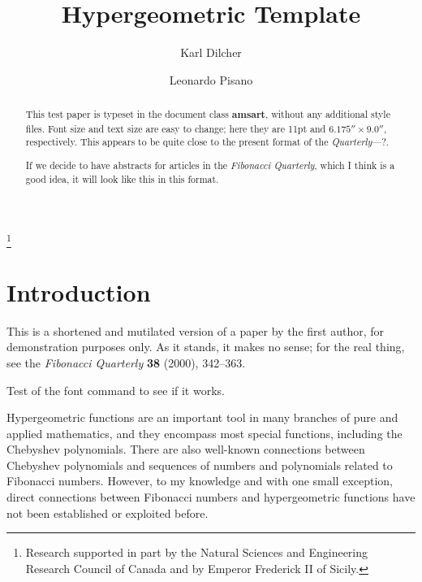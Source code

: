 \documentclass[11pt,reqno]{amsart}
\makeatletter
\newcommand{\monthyear}[1]{%
  \def\@monthyear{\uppercase{#1}}}
\newcommand{\volnumber}[1]{%
  \def\@volnumber{\uppercase{#1}}}
\theoremstyle{plain}
\numberwithin{equation}{section}
\newcommand{\helv}{%
  \fontfamily{phv}\fontseries{m}\fontsize{9}{11}\selectfont}
\makeatother
\begin{document}
\monthyear{Month Year}
\volnumber{Volume, Number}
\setcounter{page}{1}

\title{Hypergeometric Template}
\author{Karl Dilcher}
\address{Department of Mathematics and Statistics\\
                Dalhousie University\\
                Halifax, Nova Scotia\\
                B3H 3J5, Canada}
\thanks{Research supported in part by the Natural Sciences and Engineering Research Council of Canada and by Emperor Frederick II of Sicily.}
\author{Leonardo Pisano}
\address{Dipartimento di Matematica\\
               Universit\`{a} di Pisa\\
               144 Via Fibonacci\\
               56127 Pisa, Italy}

\begin{abstract}
This test paper is typeset in the document class \textbf{amsart},
without any additional style files.  Font size and text size are
easy to change; here they are 11pt and $6.175'' \times 9.0''$,
respectively.  This appears to be quite close to the present format
of the \textit{Quarterly}---?.

If we decide to have abstracts for articles in the \textit{Fibonacci
Quarterly}, which I think is a good idea, it will look like this in
this format.
\end{abstract}

\maketitle

\section{Introduction}
This is a shortened and mutilated version of a paper by the first
author, for demonstration purposes only.  As it stands, it makes no
sense; for the real thing, see the \textit{Fibonacci Quarterly}
\textbf{38} (2000), 342--363.

Test of the {\helv font command} to see if it works.

Hypergeometric functions are an important tool in many branches of
pure and applied mathematics, and they encompass most special
functions, including the Chebyshev polynomials.  There are also
well-known connections between Chebyshev polynomials and sequences
of numbers and polynomials related to Fibonacci numbers.  However,
to my knowledge and with one small exception, direct connections
between Fibonacci numbers and hypergeometric functions have not been
established or exploited before.
\end{document}
